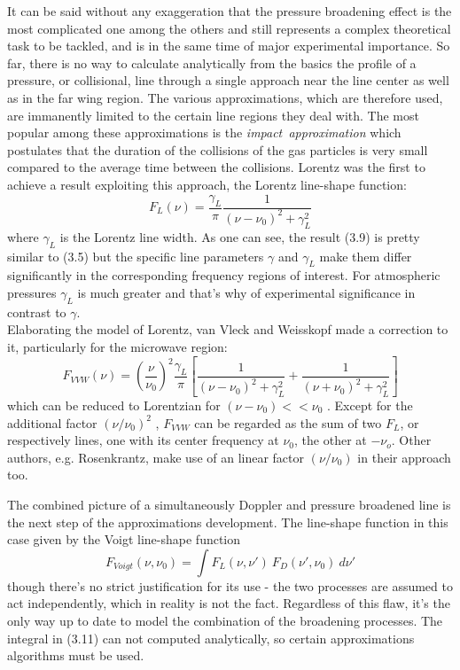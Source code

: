 It can be said without any exaggeration that the pressure broadening
effect is the most complicated one among the others and still
represents a complex theoretical task to be tackled, and is in the
same time of major experimental importance. So far, there is no way to
calculate analytically from the basics the profile of a pressure, or
collisional, line through a single approach near the line center as well
as in the far wing region. The various approximations, which are
therefore used, are immanently limited to the certain line regions
they deal with.
The most popular among these approximations is the  {\it{impact~approximation}}
which postulates that the duration of the collisions of the
gas particles is very small compared to the average time between the
collisions. Lorentz was the first to achieve a result exploiting this
approach, the Lorentz line-shape function:
\begin{equation}
 F_L(\nu)=\frac{\gamma_L}{\pi}\frac{1}{(\nu-\nu_0)^2+\gamma_L^2}
\label{}
\end{equation}
where $\gamma_L$ is the Lorentz line width. As one can see, the result
(3.9) is pretty similar to (3.5) but the specific line parameters
$\gamma$ and $\gamma_L$ make them differ significantly in the
corresponding frequency regions of interest. For atmospheric pressures
$\gamma_L$ is much greater and that's why of experimental significance
in contrast to $\gamma$.\\
Elaborating the model of Lorentz, van Vleck and Weisskopf made a correction to it, particularly
for the microwave region:
\begin{equation}
 F_{VVW} (\nu)=\left(\frac{\nu}{\nu_0}\right)^2\frac{\gamma_L}{\pi}\left[\frac{1}{(\nu-\nu_0)^2+\gamma_L^2}+\frac{1}{(\nu+\nu_0)^2+\gamma_L^2}\right]
\label{}
\end{equation}
which can be reduced to Lorentzian for $(\nu-\nu_0) << \nu_0$ . Except
for the additional factor $(\nu/\nu_0)^2$ ,  $F_{VVW}$ can be regarded
as the sum of two $F_L$, or respectively lines, one with its center
frequency at  $\nu_0$, the other at $-\nu_o$. Other authors,
e.g. Rosenkrantz,  make use of an linear factor $(\nu/\nu_0)$ in their
approach too.

The combined picture of a simultaneously Doppler and pressure
broadened line is the next step of the approximations development. The
line-shape function in this case given by the Voigt line-shape
function 
\begin{equation}
 F_{Voigt}(\nu,\nu_0)= \int F_L(\nu,\nu')~F_D(\nu',\nu_0)~d\nu'
\label{}
\end{equation}
though there's no strict justification for its use - the two processes
are assumed to act independently, which in reality is not the
fact. Regardless of this flaw, it's the only way up to date to model
the combination of the broadening processes. The integral in (3.11)
can not computed analytically, so certain approximations algorithms
must be used.


